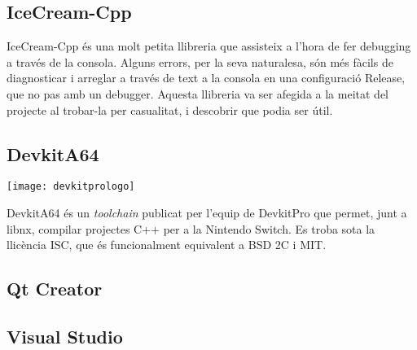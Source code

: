 \subsection{IceCream-Cpp}
IceCream-Cpp és una molt petita llibreria que assisteix a l'hora de fer debugging a través de la consola. Alguns errors, per la seva naturalesa, són més fàcils de diagnosticar i arreglar a través de text a la consola en una configuració Release, que no pas amb un debugger. Aquesta llibreria va ser afegida a la meitat del projecte al trobar-la per casualitat, i descobrir que podia ser útil.
\subsection{DevkitA64}
\begin{center}
  \texttt{[image: devkitprologo]}
\end{center}
DevkitA64 és un \textit{toolchain} publicat per l'equip de DevkitPro que permet, junt a libnx, compilar projectes C++ per a la Nintendo Switch. Es troba sota la llicència ISC, que és funcionalment equivalent a BSD 2C i MIT.
\subsection{Qt Creator}

\subsection{Visual Studio}

